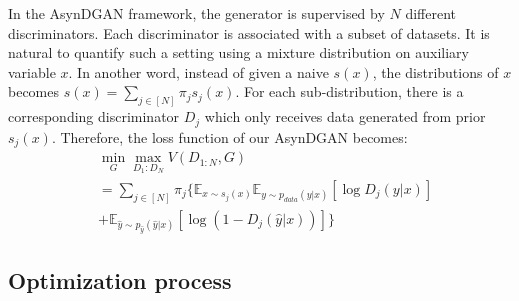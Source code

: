 In the AsynDGAN framework, the generator is supervised by $N$ different discriminators. Each discriminator is associated with a subset of datasets. It is natural to quantify such a setting using a mixture distribution on auxiliary variable $x$. In another word, instead of given a naive $s(x)$, the distributions of $x$ becomes $s(x)=\sum\limits_{j\in[N]} \pi_js_j(x)$. For each sub-distribution, there is a corresponding discriminator $D_j$ which only receives data generated from prior $s_j(x)$. Therefore, the loss function of our AsynDGAN becomes:
\begin{equation}
\begin{aligned}
&\min\limits_{G}\max\limits_{D_1:D_N}V(D_{1:N},G) \\
&= \sum\limits_{j\in [N]} \pi_j \{\mathbb{E}_{x\sim s_j(x)}\mathbb{E}_{y\sim p_{data}(y|x)} [\log D_j(y|x)] \\
&+\mathbb{E}_{\hat{y}\sim p_{\hat{y}}(\hat{y}|x)} [\log(1-D_j(\hat{y}|x))]\}
\end{aligned}
\end{equation}


\subsection{Optimization process}


